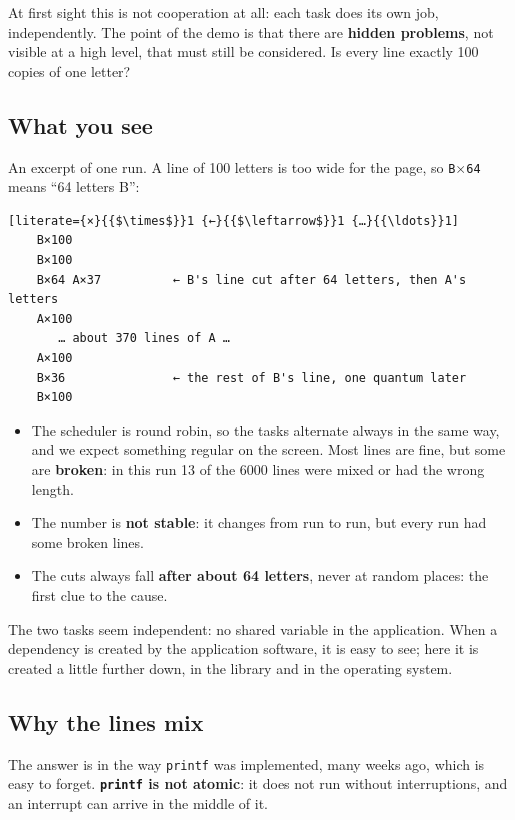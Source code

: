 At first sight this is not cooperation at all: each task does its own job, independently. The point of the demo is that there are \textbf{hidden problems}, not visible at a high level, that must still be considered. Is every line exactly 100 copies of one letter?

\subsection{What you see}
An excerpt of one run. A line of 100 letters is too wide for the page, so \texttt{B$\times$64} means ``64 letters B'':
\begin{lstlisting}[literate={×}{{$\times$}}1 {←}{{$\leftarrow$}}1 {…}{{\ldots}}1]
    B×100
    B×100
    B×64 A×37          ← B's line cut after 64 letters, then A's letters
    A×100
       … about 370 lines of A …
    A×100
    B×36               ← the rest of B's line, one quantum later
    B×100
\end{lstlisting}
\begin{itemize}
    \item The scheduler is round robin, so the tasks alternate always in the same way, and we expect something regular on the screen. Most lines are fine, but some are \textbf{broken}: in this run 13 of the 6000 lines were mixed or had the wrong length.
    \item The number is \textbf{not stable}: it changes from run to run, but every run had some broken lines.
    \item The cuts always fall \textbf{after about 64 letters}, never at random places: the first clue to the cause.
\end{itemize}
The two tasks seem independent: no shared variable in the application. When a dependency is created by the application software, it is easy to see; here it is created a little further down, in the library and in the operating system.

\subsection{Why the lines mix}
The answer is in the way \texttt{printf} was implemented, many weeks ago, which is easy to forget. \textbf{\texttt{printf} is not atomic}: it does not run without interruptions, and an interrupt can arrive in the middle of it.

